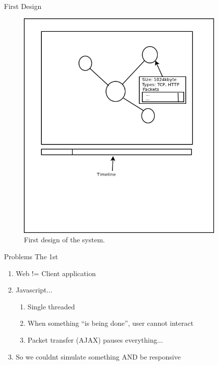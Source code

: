 \documentclass{beamer}
\begin{document}
\begin{frame}{First Design}
 \begin{figure}
 \centering
 \includegraphics[width=0.9\textwidth, height=0.9\textheight]{./img/draft1.png}
 \caption{First design of the system.}
 \label{fig:draft1}
\end{figure}	
\end{frame}

\begin{frame}{Problems The 1st}
 \begin{enumerate}
  \item Web != Client application
  \item Javascript...
  \begin{enumerate}
   \item Single threaded
   \item When something ``is being done'', user cannot interact
   \item Packet transfer (AJAX) pauses everything...
  \end{enumerate}
  \item So we couldnt simulate something AND be responsive

 \end{enumerate}

\end{frame}
\end{document}
